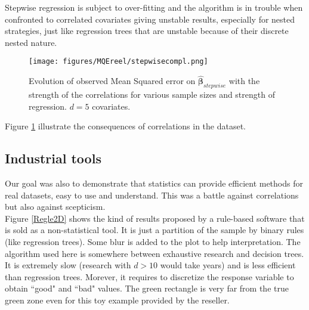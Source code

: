 \documentclass[12pt,a4paper]{report}
\begin{document}
		Stepwise regression is subject to over-fitting and the algorithm is in trouble when confronted to correlated covariates \cite{miller2002subset} giving unstable results, especially for nested strategies, just like regression trees that are unstable because of their discrete nested nature.
\begin{figure}
	 \centering
	  \texttt{[image: figures/MQEreel/stepwisecompl.png]}
	  \caption{Evolution of observed Mean Squared error on $\hat{\boldsymbol{\beta}}_{stepwise}$ with the strength of the correlations for various sample sizes and strength of regression. $d=5$ covariates. } \label{MQEstepwisecompl}
	\end{figure}
	Figure \ref{MQEstepwisecompl} illustrate the consequences of correlations in the dataset.
	
		\FloatBarrier
		\subsection{Industrial tools}
			Our goal was also to demonstrate that statistics can provide efficient methods for real datasets, easy to use and understand.	This was a battle against correlations but also against scepticism. \\
			
			Figure \ref{Regle2D} shows the kind of results proposed by a rule-based software that is sold as a non-statistical tool. It is just a partition of the sample by binary rules (like regression trees). Some blur is added to the plot to help interpretation. The algorithm used here is somewhere between exhaustive research and decision trees. It is extremely slow (research with $d>10$ would take years) and is less efficient than regression trees. Morever, it requires to discretize the response variable to obtain ``good" and ``bad" values. The green rectangle is very far from the true green zone even for this toy example provided by the reseller.\\
			
\end{document}
